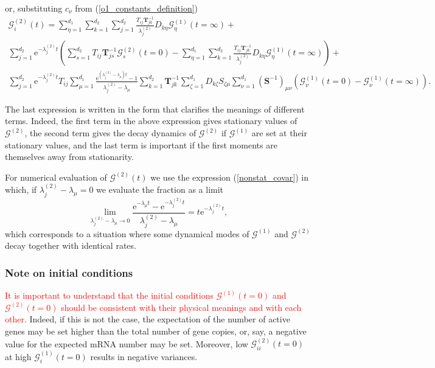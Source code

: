 \documentclass[a4paper, 11pt]{article}
\begin{document}
or, substituting $c_\nu$ from (\ref{o1_constants_definition})
\begin{multline}
  \mathcal G^{(2)}_i(t) = \sum_{\eta=1}^{d_1}\sum_{k=1}^{d_2}\sum_{j=1}^{d_2}\frac{T_{ij}\mathbf T^{-1}_{jk}}{\lambda^{(2)}_j}D_{k\eta}\mathcal G_\eta^{(1)}(t=\infty) +\\
  \sum_{j=1}^{d_2}\mathrm e^{-\lambda^{(2)}_jt}\left(\sum_{s=1}^{d_2}T_{ij}\mathbf T^{-1}_{js}\mathcal G^{(2)}_s(t=0) - \sum_{\eta=1}^{d_1}\sum_{k=1}^{d_2}\frac{T_{ij}\mathbf T^{-1}_{jk}}{\lambda^{(2)}_j}D_{k\eta}\mathcal G_\eta^{(1)}(t=\infty)\right) +\\
  \sum_{j=1}^{d_2}\mathrm e^{-\lambda^{(2)}_jt}T_{ij}\sum_{\mu=1}^{d_1}\frac{\mathrm e^{(\lambda^{(2)}_j-\lambda_\mu)t}-1}{\lambda^{(2)}_j-\lambda_\mu}\sum_{k=1}^{d_2}\mathbf T^{-1}_{jk}\sum_{\zeta=1}^{d_1}D_{k\zeta}S_{\zeta\mu}\sum_{\nu=1}^{d_1}(\mathbf S^{-1})_{\mu\nu}\left(\mathcal G_\nu^{(1)}(t=0) - \mathcal G_\nu^{(1)}(t=\infty)\right).
\end{multline}

The last expression is written in the form that clarifies the meanings of different terms. Indeed, the first term in the above expression gives stationary values of $\boldsymbol{\mathcal G}^{(2)}$, the second term gives the decay dynamics of $\boldsymbol{\mathcal G}^{(2)}$ if $\boldsymbol{\mathcal G}^{(1)}$ are set at their stationary values, and the last term is important if the first moments are themselves away from stationarity.

For numerical evaluation of $\boldsymbol{\mathcal G}^{(2)}(t)$ we use the expression (\ref{nonstat_covar}) in which, if $\lambda^{(2)}_j-\lambda_\mu=0$ we evaluate the fraction as a limit
\begin{equation}
  \lim_{\lambda^{(2)}_j-\lambda_\mu\to 0}\frac{\mathrm e^{-\lambda_\mu t}-\mathrm e^{-\lambda^{(2)}_jt}}{\lambda^{(2)}_j-\lambda_\mu} = t\mathrm e^{-\lambda^{(2)}_jt},
\end{equation}
which corresponds to a situation where some dynamical modes of $\boldsymbol{\mathcal G}^{(1)}$ and $\boldsymbol{\mathcal G}^{(2)}$ decay together with identical rates.

\subsubsection{Note on initial conditions}
\textcolor{red}{It is important to understand that the initial conditions $\boldsymbol{\mathcal G}^{(1)}(t=0)$ and $\boldsymbol{\mathcal G}^{(2)}(t=0)$ should be consistent with their physical meanings and with each other.} Indeed, if this is not the case, the expectation of the number of active genes may be set higher than the total number of gene copies, or, say, a negative value for the expected mRNA number may be set. Moreover, low $\mathcal G_{ii}^{(2)}(t=0)$ at high $\mathcal G_i^{(1)}(t=0)$ results in negative variances.
\end{document}
